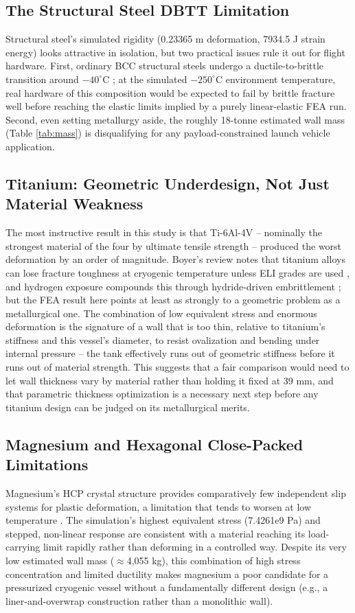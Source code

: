 \documentclass[conference]{IEEEtran}
\begin{document}
\subsection{The Structural Steel DBTT Limitation}
Structural steel's simulated rigidity (0.23365 m deformation, 7934.5 J strain energy) looks attractive in isolation, but two practical issues rule it out for flight hardware. First, ordinary BCC structural steels undergo a ductile-to-brittle transition around $-40^{\circ}$C \cite{dieter1986}; at the simulated $-250^{\circ}$C environment temperature, real hardware of this composition would be expected to fail by brittle fracture well before reaching the elastic limits implied by a purely linear-elastic FEA run. Second, even setting metallurgy aside, the roughly 18-tonne estimated wall mass (Table \ref{tab:mass}) is disqualifying for any payload-constrained launch vehicle application.

\subsection{Titanium: Geometric Underdesign, Not Just Material Weakness}
The most instructive result in this study is that Ti-6Al-4V -- nominally the strongest material of the four by ultimate tensile strength -- produced the worst deformation by an order of magnitude. Boyer's review notes that titanium alloys can lose fracture toughness at cryogenic temperature unless ELI grades are used \cite{boyer1996}, and hydrogen exposure compounds this through hydride-driven embrittlement \cite{tal2005}; but the FEA result here points at least as strongly to a geometric problem as a metallurgical one. The combination of low equivalent stress and enormous deformation is the signature of a wall that is too thin, relative to titanium's stiffness and this vessel's diameter, to resist ovalization and bending under internal pressure -- the tank effectively runs out of geometric stiffness before it runs out of material strength. This suggests that a fair comparison would need to let wall thickness vary by material rather than holding it fixed at 39 mm, and that parametric thickness optimization is a necessary next step before any titanium design can be judged on its metallurgical merits.

\subsection{Magnesium and Hexagonal Close-Packed Limitations}
Magnesium's HCP crystal structure provides comparatively few independent slip systems for plastic deformation, a limitation that tends to worsen at low temperature \cite{dieter1986}. The simulation's highest equivalent stress (7.4261e9 Pa) and stepped, non-linear response are consistent with a material reaching its load-carrying limit rapidly rather than deforming in a controlled way. Despite its very low estimated wall mass ($\approx$4,055 kg), this combination of high stress concentration and limited ductility makes magnesium a poor candidate for a pressurized cryogenic vessel without a fundamentally different design (e.g., a liner-and-overwrap construction rather than a monolithic wall).
\end{document}
